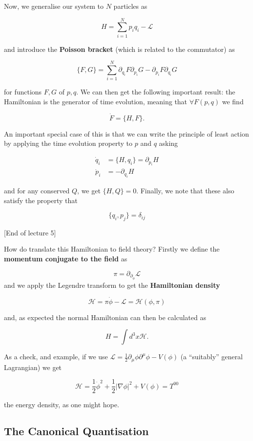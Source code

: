 \documentclass{article}
\theoremstyle{definition}
\begin{document}
Now, we generalise our system to $N$ particles as

$$ H = \sum_{i=1}^N p_i q_i - \mathcal{L} $$

and introduce the \textbf{Poisson
  bracket} (which is related to the commutator) as 

$$ \{F, G\} = \sum_{i = 1}^N \partial_{q_i} F \partial_{p_i} G - \partial_{p_i}
F \partial_{q_i} G $$

for functions $F, G$ of $p, q$. We can then get the following important result:
the Hamiltonian is the generator of time evolution, meaning that $\forall F(p,
q)$ we find

$$ \dot{F} = \{H, F\}. $$

An important special case of this is that we can write the principle of least
action by applying the time evolution property to $p$ and $q$ asking

\begin{align*}
  \dot{q}_i &= \{H, q_i\} = \partial_{p_i} H \\
  \dot{p}_i &= -\partial_{q_i} H
\end{align*}

and for any conserved $Q$, we get $\{H, Q\} = 0$. Finally, we note that these
also satisfy the property that

$$ \{q_i, p_j\} = \delta_{ij}$$

[End of lecture 5]

How do translate this Hamiltonian to field theory? Firstly we define the
\textbf{momentum conjugate to the field} as

$$ \pi = \partial_{\partial_{\dot{\phi}}} \mathcal{L} $$
and we apply the Legendre transform to get the \textbf{Hamiltonian density}

$$ \mathcal{H} = \pi \dot{\phi} - \mathcal{L} = \mathcal{H}(\phi, \pi) $$

and, as expected the normal Hamiltonian can then be calculated as

$$ H = \int d^3x \mathcal{H}. $$

As a check, and example, if we use $\mathcal{L} = \frac{1}{2}\partial_\mu \phi
\partial^\mu \phi - V(\phi)$ (a ``suitably'' general Lagrangian) we get

$$ \mathcal{H} = \frac{1}{2} \dot{\phi}^2 + \frac{1}{2} | \nabla \phi|^2 +
V(\phi) = T^{00} $$

the energy density, as one might hope.

\subsection{The Canonical Quantisation}
\end{document}
